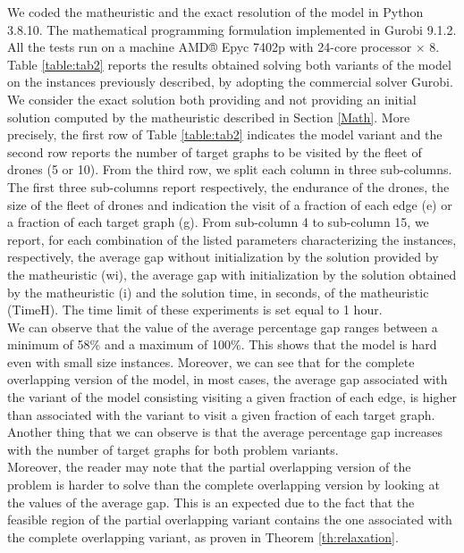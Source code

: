 \noindent
We coded the matheuristic and the exact resolution of the model in Python 3.8.10. The mathematical programming formulation  implemented in Gurobi 9.1.2. All the tests  run on a machine AMD® Epyc 7402p with 24-core processor × 8.
Table \ref{table:tab2} reports the results obtained solving both variants of the \AMD\xspace model on the instances previously described, by adopting the commercial solver Gurobi. We consider the exact solution both providing and not providing an initial solution computed by the matheuristic described in Section \ref{Math}. More precisely, the first row of Table \ref{table:tab2} indicates the model variant and the second row reports the number of target graphs to be visited by the fleet of drones (5 or 10). From the third row, we split each column in three sub-columns. The first three sub-columns report respectively, the endurance of the drones, the size of the fleet of drones and  indication  the visit of a fraction of each edge (e) or a fraction of each target graph (g). From sub-column 4 to sub-column 15, we report, for each combination of the listed parameters characterizing the instances, respectively, the average gap without initialization by the solution provided by the matheuristic (wi), the average gap with initialization by the solution obtained by the matheuristic (i) and the solution time, in seconds, of the matheuristic (TimeH). The time limit of these experiments is set equal to 1 hour.\\
\noindent
We can observe that the value of the average percentage gap ranges between a minimum of 58\% and a maximum of 100\%. This shows that the model is hard  even with small size instances. Moreover, we can see that for the complete overlapping version of the model, in most cases, the average gap associated with the variant of the model consisting  visiting a given fraction of each edge, is higher than  associated with the variant  to visit a given fraction of each target graph. 
Another thing that we can observe is that the average percentage gap increases with the number of target graphs for both problem variants.\\
\noindent
Moreover, the reader may note that the partial overlapping version of the problem is harder to solve than the complete overlapping version by looking at the values of the average gap. This is an expected  due to the fact that the feasible region of the partial overlapping variant contains the one associated with the complete overlapping variant, as proven in Theorem \ref{th:relaxation}. 
